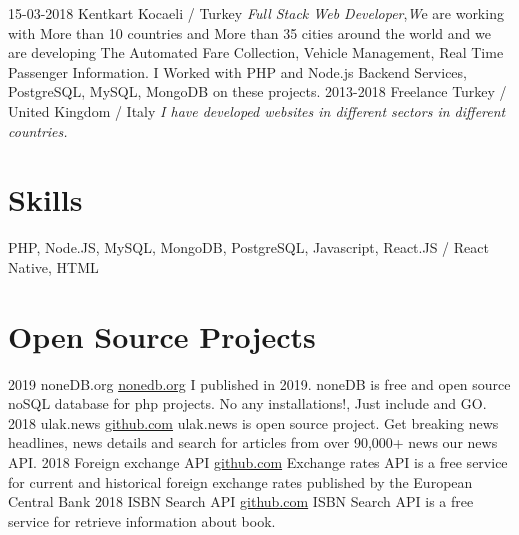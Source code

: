 \documentclass[]{friggeri-cv}
\begin{document}
\begin{entrylist}
  \entry
    {15-03-2018}
    {Kentkart}
    {Kocaeli / Turkey}
    {\emph{Full Stack Web Developer},\emph We are working with More than 10 countries and More than 35 cities around the world and we are developing The Automated Fare Collection, Vehicle Management, Real Time Passenger Information.
I Worked with PHP and Node.js Backend Services, PostgreSQL, MySQL, MongoDB on these projects.}
  \entry
    {2013-2018}
    {Freelance}
    {Turkey / United Kingdom / Italy}
    {\emph{I have developed websites in different sectors in different countries.}}
\end{entrylist}

\section{Skills}

PHP, Node.JS, MySQL, MongoDB, PostgreSQL, Javascript, React.JS / React Native, HTML

\section{Open Source Projects}

\begin{entrylist}
  \entry
    {2019}
    {noneDB.org}
    {\href{https://github.com/orhanayd/noneDB}{nonedb.org}}
    {I published in 2019. noneDB is free and open source noSQL database for php projects. No any installations!, Just include and GO.}
  \entry
    {2018}
    {ulak.news}
    {\href{https://github.com/orhanayd/ulak.news}{github.com}}
    {ulak.news is open source project. Get breaking news headlines, news details and search for articles from over 90,000+ news our news API. }
  \entry
    {2018}
    {Foreign exchange API}
    {\href{https://github.com/orhanayd/Foreign-exchange-API}{github.com}}
    {Exchange rates API is a free service for current and historical foreign exchange rates
published by the European Central Bank}
  \entry
    {2018}
    {ISBN Search API}
    {\href{https://github.com/orhanayd/isbn-search}{github.com}}
    {ISBN Search API is a free service for retrieve information about book.}
\end{entrylist}
\end{document}
